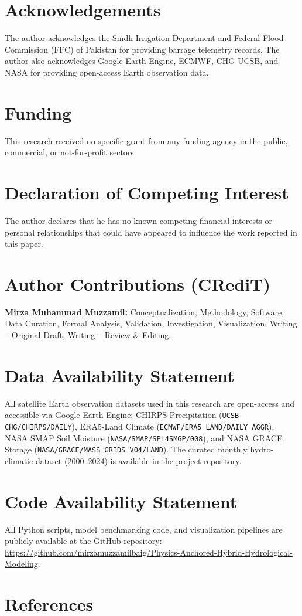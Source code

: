 \documentclass[11pt,a4paper,fleqn]{article}
\begin{document}
\section*{Acknowledgements}
The author acknowledges the Sindh Irrigation Department and Federal Flood Commission (FFC) of Pakistan for providing barrage telemetry records. The author also acknowledges Google Earth Engine, ECMWF, CHG UCSB, and NASA for providing open-access Earth observation data.

\section*{Funding}
This research received no specific grant from any funding agency in the public, commercial, or not-for-profit sectors.

\section*{Declaration of Competing Interest}
The author declares that he has no known competing financial interests or personal relationships that could have appeared to influence the work reported in this paper.

\section*{Author Contributions (CRediT)}
\textbf{Mirza Muhammad Muzzamil:} Conceptualization, Methodology, Software, Data Curation, Formal Analysis, Validation, Investigation, Visualization, Writing -- Original Draft, Writing -- Review \& Editing.

\section*{Data Availability Statement}
All satellite Earth observation datasets used in this research are open-access and accessible via Google Earth Engine:
CHIRPS Precipitation (\texttt{UCSB-CHG/CHIRPS/DAILY}), ERA5-Land Climate (\texttt{ECMWF/ERA5\_LAND/DAILY\_AGGR}), NASA SMAP Soil Moisture (\texttt{NASA/SMAP/SPL4SMGP/008}), and NASA GRACE Storage (\texttt{NASA/GRACE/MASS\_GRIDS\_V04/LAND}). The curated monthly hydro-climatic dataset (2000--2024) is available in the project repository.

\section*{Code Availability Statement}
All Python scripts, model benchmarking code, and visualization pipelines are publicly available at the GitHub repository: \url{https://github.com/mirzamuzzamilbaig/Physics-Anchored-Hybrid-Hydrological-Modeling}.

\section*{References}


\end{document}
